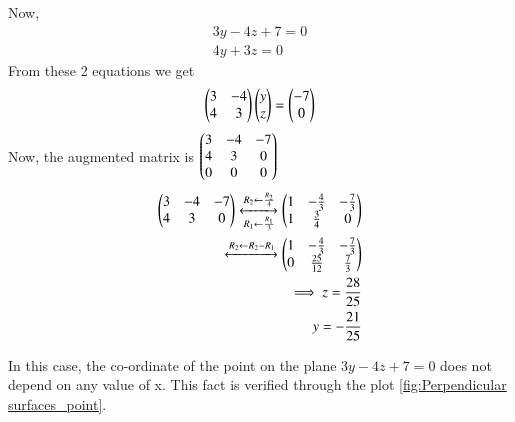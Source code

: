 \documentclass[journal,12pt,twocolumn]{IEEEtran}
\renewcommand\thesection{\arabic{section}}
\begin{document}
Now,
\begin{align}
3y-4z+7 =0\\
4y+3z=0
\end{align}
From these 2 equations we get 
\begin{align}
\begin{pmatrix}3&-4\\4&3\end{pmatrix} \begin{pmatrix}y\\z\end{pmatrix} = \begin{pmatrix}-7\\0\end{pmatrix}
\end{align}
Now, the augmented matrix is $\begin{pmatrix}3&-4&-7\\4&3&0\\0&0&0\end{pmatrix}$
\begin{align}
\begin{pmatrix}3&-4&-7\\4&3&0\end{pmatrix} \xleftrightarrow[R_1\leftarrow \frac{R_1}{3}]{R_2\leftarrow \frac{R_2}{4}}\begin{pmatrix}1&-\frac{4}{3}&-\frac{7}{3}\\1&\frac{3}{4}&0\end{pmatrix}\\
\xleftrightarrow[]{R_2\leftarrow R_2-R_1}\begin{pmatrix}1&-\frac{4}{3}&-\frac{7}{3}\\0&\frac{25}{12}&\frac{7}{3}\end{pmatrix}\\
\implies z= \frac{28}{25}\\
y= -\frac{21}{25}
\end{align}

In this case, the co-ordinate of the point on the plane $3y-4z+7 =0$ does not depend on any value of x. This fact is verified through the plot \ref{fig:Perpendicular surfaces_point}.
\end{document}
